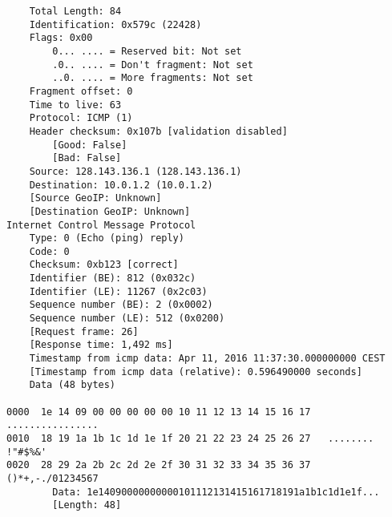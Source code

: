 \begin{lstlisting}
    Total Length: 84
    Identification: 0x579c (22428)
    Flags: 0x00
        0... .... = Reserved bit: Not set
        .0.. .... = Don't fragment: Not set
        ..0. .... = More fragments: Not set
    Fragment offset: 0
    Time to live: 63
    Protocol: ICMP (1)
    Header checksum: 0x107b [validation disabled]
        [Good: False]
        [Bad: False]
    Source: 128.143.136.1 (128.143.136.1)
    Destination: 10.0.1.2 (10.0.1.2)
    [Source GeoIP: Unknown]
    [Destination GeoIP: Unknown]
Internet Control Message Protocol
    Type: 0 (Echo (ping) reply)
    Code: 0
    Checksum: 0xb123 [correct]
    Identifier (BE): 812 (0x032c)
    Identifier (LE): 11267 (0x2c03)
    Sequence number (BE): 2 (0x0002)
    Sequence number (LE): 512 (0x0200)
    [Request frame: 26]
    [Response time: 1,492 ms]
    Timestamp from icmp data: Apr 11, 2016 11:37:30.000000000 CEST
    [Timestamp from icmp data (relative): 0.596490000 seconds]
    Data (48 bytes)

0000  1e 14 09 00 00 00 00 00 10 11 12 13 14 15 16 17   ................
0010  18 19 1a 1b 1c 1d 1e 1f 20 21 22 23 24 25 26 27   ........ !"#$%&'
0020  28 29 2a 2b 2c 2d 2e 2f 30 31 32 33 34 35 36 37   ()*+,-./01234567
        Data: 1e14090000000000101112131415161718191a1b1c1d1e1f...
        [Length: 48]
\end{lstlisting}

